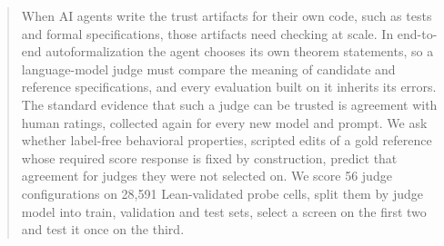 \begin{abstract}
When AI agents write the trust artifacts for their own code, such as tests and formal specifications, those artifacts need checking at scale.
In end-to-end autoformalization the agent chooses its own theorem statements, so a language-model judge must compare the meaning of candidate and reference specifications, and every evaluation built on it inherits its errors.
The standard evidence that such a judge can be trusted is agreement with human ratings, collected again for every new model and prompt.
We ask whether label-free behavioral properties, scripted edits of a gold reference whose required score response is fixed by construction, predict that agreement for judges they were not selected on.
We score 56 judge configurations on 28{,}591 Lean-validated probe cells, split them by judge model into train, validation and test sets, select a screen on the first two and test it once on the third.

\end{abstract}
